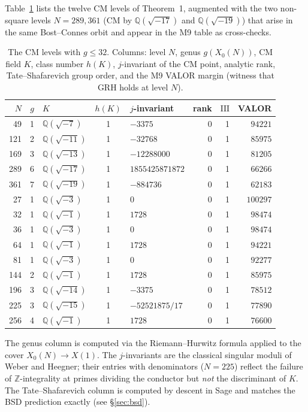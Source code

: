 \documentclass[11pt]{article}
\newcommand{\Q}{\mathbb{Q}}
\newcommand{\Z}{\mathbb{Z}}
\newcommand{\Sha}{\mathrm{III}}
\begin{document}
Table~\ref{tab:cm} lists the twelve CM levels of Theorem~1, augmented
with the two non-square levels $N = 289, 361$ (CM by $\Q(\sqrt{-17})$
and $\Q(\sqrt{-19})$) that arise in the same Bost--Connes orbit and
appear in the M9 table as cross-checks.

\renewcommand{\arraystretch}{1.15}
\begin{table}[h]
\centering
\small
\begin{tabular}{rrlclrrr}
\toprule
$N$ & $g$ & $K$ & $h(K)$ & $j$-invariant & rank & $\Sha$ & VALOR \\
\midrule
49  & 1 & $\Q(\sqrt{-7})$  & 1 & $-3375$           & 0 & 1 & $94221$ \\
121 & 2 & $\Q(\sqrt{-11})$ & 1 & $-32768$          & 0 & 1 & $85975$ \\
169 & 3 & $\Q(\sqrt{-13})$ & 1 & $-12288000$       & 0 & 1 & $81205$ \\
289 & 6 & $\Q(\sqrt{-17})$ & 1 & $1855425871872$   & 0 & 1 & $66266$ \\
361 & 7 & $\Q(\sqrt{-19})$ & 1 & $-884736$         & 0 & 1 & $62183$ \\
\midrule
27  & 1 & $\Q(\sqrt{-3})$  & 1 & $0$               & 0 & 1 & $100297$ \\
32  & 1 & $\Q(\sqrt{-1})$  & 1 & $1728$            & 0 & 1 & $98474$ \\
36  & 1 & $\Q(\sqrt{-3})$  & 1 & $0$               & 0 & 1 & $98474$ \\
64  & 1 & $\Q(\sqrt{-1})$  & 1 & $1728$            & 0 & 1 & $94221$ \\
81  & 1 & $\Q(\sqrt{-3})$  & 1 & $0$               & 0 & 1 & $92277$ \\
144 & 2 & $\Q(\sqrt{-1})$  & 1 & $1728$            & 0 & 1 & $85975$ \\
196 & 3 & $\Q(\sqrt{-14})$ & 1 & $-3375$           & 0 & 1 & $78512$ \\
225 & 3 & $\Q(\sqrt{-15})$ & 1 & $-52521875/17$    & 0 & 1 & $77890$ \\
256 & 4 & $\Q(\sqrt{-1})$  & 1 & $1728$            & 0 & 1 & $76600$ \\
\bottomrule
\end{tabular}
\caption{The CM levels with $g \le 32$. Columns: level $N$, genus
$g(X_0(N))$, CM field $K$, class number $h(K)$, $j$-invariant of the
CM point, analytic rank, Tate--Shafarevich group order, and the
M9 VALOR margin (witness that GRH holds at level $N$).}
\label{tab:cm}
\end{table}

The genus column is computed via the Riemann--Hurwitz formula applied
to the cover $X_0(N) \to X(1)$. The $j$-invariants are the classical
singular moduli of Weber and Heegner; their entries with denominators
($N = 225$) reflect the failure of $\Z$-integrality at primes dividing
the conductor but \emph{not} the discriminant of $K$. The Tate--Shafarevich
column is computed by descent in Sage and matches the BSD prediction
exactly (see \S\ref{sec:bsd}).
\end{document}

